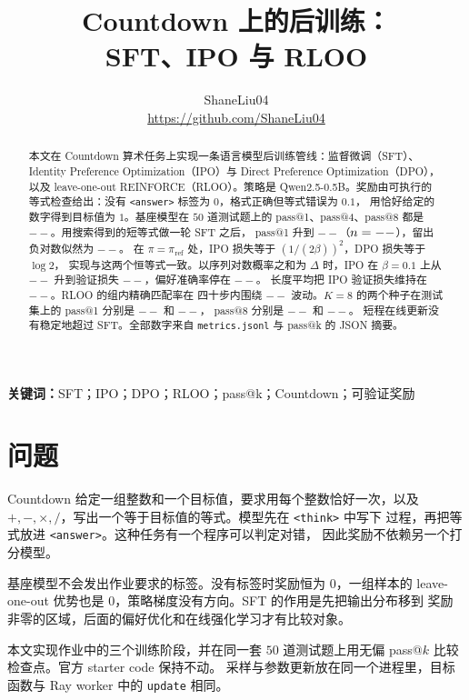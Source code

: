 \documentclass[10pt,twocolumn,a4paper]{ctexart}
\title{\vspace{-1.2em}\textbf{Countdown 上的后训练：\\
SFT、IPO 与 RLOO}}
\author{ShaneLiu04\\
\small\url{https://github.com/ShaneLiu04}}
\date{}
\providecommand{\SftEvalNll}{--}\providecommand{\SftSteps}{--}
\providecommand{\IpoLossStart}{--}\providecommand{\IpoLossEnd}{--}
\providecommand{\IpoEvalLoss}{--}\providecommand{\IpoEvalAcc}{--}
\providecommand{\IpoMeanEvalLoss}{--}\providecommand{\IpoMeanEvalAcc}{--}
\providecommand{\RlooKEightExactMean}{--}\providecommand{\RlooKEightRewardMean}{--}
\providecommand{\PassBaseOne}{--}\providecommand{\PassBaseFour}{--}\providecommand{\PassBaseEight}{--}
\providecommand{\PassSftOne}{--}\providecommand{\PassSftFour}{--}
\providecommand{\PassRlooKEightOne}{--}\providecommand{\PassRlooKEightFour}{--}
\providecommand{\PassRlooKEightEight}{--}
\providecommand{\PassRlooKEightSeedOneOne}{--}\providecommand{\PassRlooKEightSeedOneEight}{--}
\begin{document}
\maketitle
\thispagestyle{fancy}

\begin{abstract}
本文在 Countdown 算术任务上实现一条语言模型后训练管线：监督微调（SFT）、
Identity Preference Optimization（IPO）与 Direct Preference Optimization（DPO），
以及 leave-one-out REINFORCE（RLOO）。策略是 Qwen2.5-0.5B。奖励由可执行的
等式检查给出：没有 \texttt{<answer>} 标签为 $0$，格式正确但等式错误为 $0.1$，
用恰好给定的数字得到目标值为 $1$。基座模型在 $50$ 道测试题上的
pass@1、pass@4、pass@8 都是 $\PassBaseOne$。用搜索得到的短等式做一轮 SFT 之后，
pass@1 升到 $\PassSftOne$（$n=--$），留出负对数似然为 $\SftEvalNll$。
在 $\pi=\pi_{\mathrm{ref}}$ 处，IPO 损失等于 $(1/(2\beta))^2$，DPO 损失等于 $\log 2$，
实现与这两个恒等式一致。以序列对数概率之和为 $\Delta$ 时，IPO 在 $\beta=0.1$
上从 $\IpoLossStart$ 升到验证损失 $\IpoEvalLoss$，偏好准确率停在 $\IpoEvalAcc$。
长度平均把 IPO 验证损失维持在 $\IpoMeanEvalLoss$。RLOO 的组内精确匹配率在
四十步内围绕 $\RlooKEightExactMean$ 波动。$K=8$ 的两个种子在测试集上的
pass@1 分别是 $\PassRlooKEightOne$ 和 $\PassRlooKEightSeedOneOne$，
pass@8 分别是 $\PassRlooKEightEight$ 和 $\PassRlooKEightSeedOneEight$。
短程在线更新没有稳定地超过 SFT。全部数字来自 \texttt{metrics.jsonl} 与
pass@k 的 JSON 摘要。
\end{abstract}

\textbf{关键词：}SFT；IPO；DPO；RLOO；pass@k；Countdown；可验证奖励

\section{问题}
Countdown 给定一组整数和一个目标值，要求用每个整数恰好一次，以及
$+,-,\times,/$，写出一个等于目标值的等式。模型先在 \texttt{<think>} 中写下
过程，再把等式放进 \texttt{<answer>}。这种任务有一个程序可以判定对错，
因此奖励不依赖另一个打分模型\citep{cobbe2021gsm8k,uesato2022outcome,lightman2023verify}。

基座模型不会发出作业要求的标签。没有标签时奖励恒为 $0$，一组样本的
leave-one-out 优势也是 $0$，策略梯度没有方向。SFT 的作用是先把输出分布移到
奖励非零的区域，后面的偏好优化和在线强化学习才有比较对象\citep{ouyang2022instructgpt,gandhi2025cognitive}。

本文实现作业中的三个训练阶段，并在同一套 $50$ 道测试题上用无偏
pass@$k$ 比较检查点\citep{chen2021codex}。官方 starter code 保持不动。
采样与参数更新放在同一个进程里，目标函数与 Ray worker 中的
\texttt{update} 相同。
\end{document}
